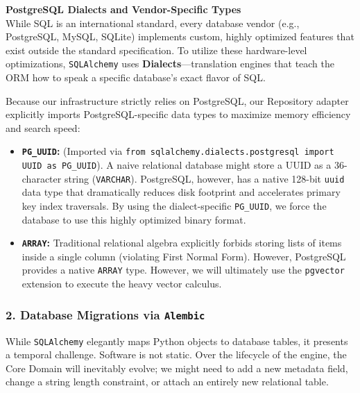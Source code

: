 \textbf{PostgreSQL Dialects and Vendor-Specific Types} \\
While SQL is an international standard, every database vendor (e.g., PostgreSQL, MySQL, SQLite) implements custom, highly optimized features that exist outside the standard specification. To utilize these hardware-level optimizations, \texttt{SQLAlchemy} uses \textbf{Dialects}---translation engines that teach the ORM how to speak a specific database's exact flavor of SQL.

Because our infrastructure strictly relies on PostgreSQL, our Repository adapter explicitly imports PostgreSQL-specific data types to maximize memory efficiency and search speed:

\begin{itemize}
    \item \textbf{\texttt{PG\_UUID}:} (Imported via \texttt{from sqlalchemy.dialects.postgresql import UUID as PG\_UUID}). A naive relational database might store a UUID as a 36-character string (\texttt{VARCHAR}). PostgreSQL, however, has a native 128-bit \texttt{uuid} data type that dramatically reduces disk footprint and accelerates primary key index traversals. By using the dialect-specific \texttt{PG\_UUID}, we force the database to use this highly optimized binary format.
    \item \textbf{\texttt{ARRAY}:} Traditional relational algebra explicitly forbids storing lists of items inside a single column (violating First Normal Form). However, PostgreSQL provides a native \texttt{ARRAY} type. However, we will ultimately use the \texttt{pgvector} extension to execute the heavy vector calculus. %
\end{itemize}


\subsubsection*{2. Database Migrations via \texttt{Alembic}}

While \texttt{SQLAlchemy} elegantly maps Python objects to database tables, it presents a temporal challenge. Software is not static. Over the lifecycle of the engine, the Core Domain will inevitably evolve; we might need to add a new metadata field, change a string length constraint, or attach an entirely new relational table.

